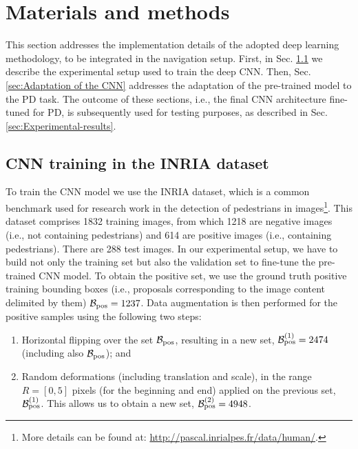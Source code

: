 \documentclass[5p,time]{elsarticle}
\begin{document}
\section{Materials and methods}\label{sec:Material-and-methods}

This section addresses the implementation details of the adopted deep
learning methodology, to be integrated in the navigation
setup. First, in Sec. \ref{sec:deep-trn-tst} we describe the
experimental setup used to train the deep CNN. Then,
Sec.
\ref{sec:Adaptation of the CNN} addresses the adaptation of the
pre-trained model to the PD task. The outcome of these sections,
i.e., the final CNN architecture fine-tuned for PD, is subsequently
used for testing purposes, as described in Sec.
\ref{sec:Experimental-results}.

\subsection{CNN training in the INRIA dataset}\label{sec:deep-trn-tst}

To train the CNN model we use the INRIA dataset, which is a common benchmark used for research work in the detection of pedestrians in images\footnote{More details can be found at: \url{http://pascal.inrialpes.fr/data/human/}.}. This dataset comprises 1832 training images, from which 1218 are negative images (i.e., not containing pedestrians) and 614 are positive images (i.e., containing pedestrians). There are 288 test images. In our experimental setup, we have to build not only the training set but also the validation set to fine-tune the pre-trained CNN model. To obtain the positive set, we use the ground truth positive training bounding boxes (i.e., proposals corresponding to the image content delimited by them) ${\cal B}_{\rm pos}=1237$. Data augmentation is then performed for the positive samples using the following two steps:
\begin{enumerate}
	\item{Horizontal flipping over the set ${\cal B}_{\rm pos}$, resulting in a new set, ${\cal B}^{(1)}_{\rm pos}=2474$ (including also
		${\cal B}_{\rm pos}$); and} 
	\item{Random deformations (including translation and scale), in the range $R=[0, 5]$ pixels (for the beginning and end) applied on the previous set, ${\cal B}^{(1)}_{\rm pos}$. This allows us to obtain a new set, ${\cal B}^{(2)}_{\rm pos}=4948$.} 
\end{enumerate}
\end{document}

